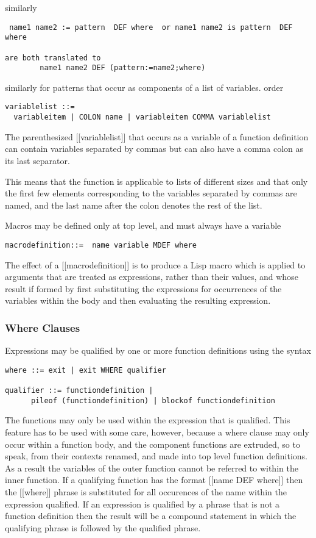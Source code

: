 \documentclass{article}
\begin{document}
similarly
\begin{verbatim}
 name1 name2 := pattern  DEF where  or name1 name2 is pattern  DEF where

are both translated to
        name1 name2 DEF (pattern:=name2;where)
\end{verbatim}

similarly for patterns that occur as components of a list of
variables. order
\begin{verbatim}
variablelist ::=
  variableitem | COLON name | variableitem COMMA variablelist
\end{verbatim}

The parenthesized [[variablelist]] that occurs as a variable of a function
definition can contain variables separated by commas but can also
have a comma colon as its last separator.

This means that the function is applicable to lists of different
sizes and that only the first few elements corresponding to the
variables separated by commas are named, and
the last name after the colon denotes the rest of the list.

Macros may be defined only at top level, and must always have a variable
\begin{verbatim}
macrodefinition::=  name variable MDEF where
\end{verbatim}

The effect of a [[macrodefinition]] is to produce a Lisp macro
which is applied to arguments that are treated as expressions, rather
than their values, and whose result if formed by first substituting
the expressions for occurrences of the variables within the body
and then evaluating the resulting expression.

\subsubsection{Where Clauses}
\label{sec:boot:where-clause}

Expressions may be qualified by one or more function definitions
using the syntax
\begin{verbatim}
where ::= exit | exit WHERE qualifier

qualifier ::= functiondefinition |
      pileof (functiondefinition) | blockof functiondefinition
\end{verbatim}

The functions may only be used within the expression that is qualified.
This feature has to be used with some care, however, because
a where clause may only occur within a function body, and
the component functions are extruded, so to speak, from their contexts
renamed, and made into top level function definitions.
As a result the variables of the outer function cannot be referred to
within the inner function.
If a qualifying function has the format [[name DEF where]] then
the [[where]] phrase is substituted for all occurences of the name
within the expression qualified.
If an expression is qualified by a phrase that is not a
function definition then the result will be a compound statement
in which the qualifying phrase is followed by the qualified phrase.
\end{document}

